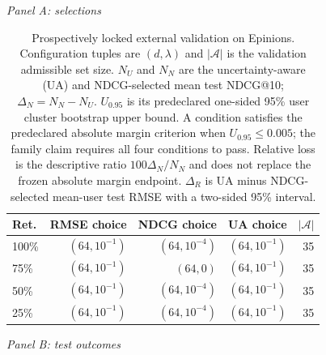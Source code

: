 \begin{table}[H]
\centering
\caption{Prospectively locked external validation on Epinions. Configuration tuples are $(d,\lambda)$ and $|\mathcal{A}|$ is the validation admissible set size. $N_U$ and $N_N$ are the uncertainty-aware (UA) and NDCG-selected mean test NDCG@10; $\Delta_N=N_N-N_U$. $U_{0.95}$ is its predeclared one-sided 95\% user cluster bootstrap upper bound. A condition satisfies the predeclared absolute margin criterion when $U_{0.95}\leq0.005$; the family claim requires all four conditions to pass. Relative loss is the descriptive ratio $100\Delta_N/N_N$ and does not replace the frozen absolute margin endpoint. $\Delta_R$ is UA minus NDCG-selected mean-user test RMSE with a two-sided 95\% interval.}
\label{tab:prospective-framework}
\small
\textit{Panel A: selections}\par\smallskip
\begin{tabular}{@{}lrrrr@{}}
\toprule
Ret. & RMSE choice & NDCG choice & UA choice & $|\mathcal{A}|$ \\
\midrule
100\% & $(64,10^{-1})$ & $(64,10^{-4})$ & $(64,10^{-1})$ & 35 \\
75\% & $(64,10^{-1})$ & $(64,0)$ & $(64,10^{-1})$ & 35 \\
50\% & $(64,10^{-1})$ & $(64,10^{-4})$ & $(64,10^{-1})$ & 35 \\
25\% & $(64,10^{-1})$ & $(64,10^{-4})$ & $(64,10^{-1})$ & 35 \\
\bottomrule
\end{tabular}
\par\medskip
\textit{Panel B: test outcomes}\par\smallskip
{}
\end{table}
